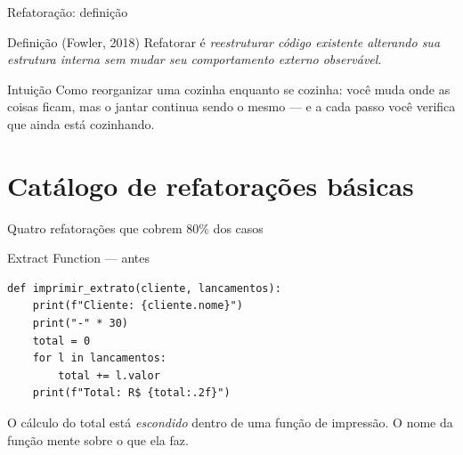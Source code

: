 \documentclass[aspectratio=169]{beamer}
\begin{document}
\begin{frame}{Refatoração: definição}
  \begin{block}{Definição (Fowler, 2018)}
    Refatorar é \emph{reestruturar código existente alterando sua estrutura
    interna sem mudar seu comportamento externo observável}.
  \end{block}
  \begin{exampleblock}{Intuição}
    Como reorganizar uma cozinha enquanto se cozinha: você muda onde as
    coisas ficam, mas o jantar continua sendo o mesmo --- e a cada passo
    você verifica que ainda está cozinhando.
  \end{exampleblock}
\end{frame}

\section{Catálogo de refatorações básicas}

\begin{frame}[shrink]{Quatro refatorações que cobrem 80\% dos casos}
  \begin{center}
  \end{center}
  \vfill
  \begin{center}
  \quad
  \end{center}
\end{frame}

\begin{frame}[fragile]{Extract Function --- antes}
\begin{lstlisting}
def imprimir_extrato(cliente, lancamentos):
    print(f"Cliente: {cliente.nome}")
    print("-" * 30)
    total = 0
    for l in lancamentos:
        total += l.valor
    print(f"Total: R$ {total:.2f}")
\end{lstlisting}
\small O cálculo do total está \emph{escondido} dentro de uma função de
impressão. O nome da função mente sobre o que ela faz.
\end{frame}
\end{document}
